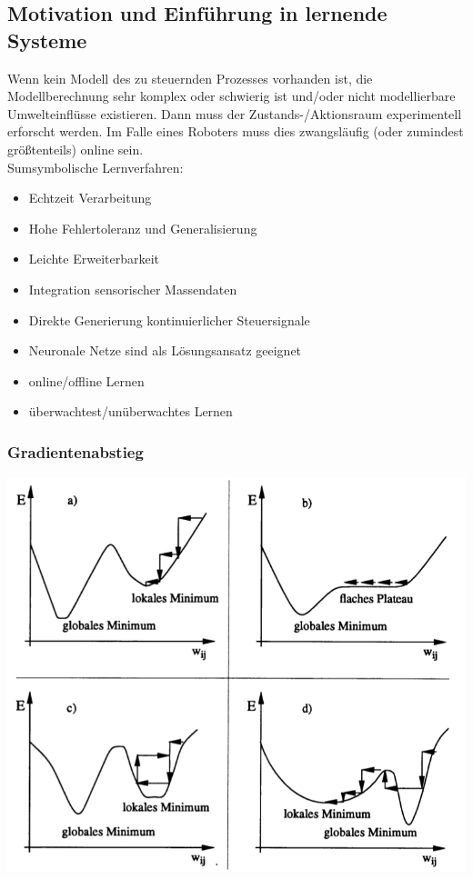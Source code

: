 \subsection{Motivation und Einführung in lernende Systeme}
%
Wenn kein Modell des zu steuernden Prozesses vorhanden ist, die Modellberechnung sehr komplex oder schwierig ist und/oder nicht modellierbare Umwelteinflüsse existieren.
Dann muss der Zustands-/Aktionsraum experimentell erforscht werden.
Im Falle eines Roboters muss dies zwangsläufig (oder zumindest größtenteils) online sein.\\
%
Sumsymbolische Lernverfahren:
\begin{itemize}
	\item Echtzeit Verarbeitung
	\item Hohe Fehlertoleranz und Generalisierung
	\item Leichte Erweiterbarkeit
	\item Integration sensorischer Massendaten
	\item Direkte Generierung kontinuierlicher Steuersignale
	\item Neuronale Netze sind als Lösungsansatz geeignet
	\item online/offline Lernen
	\item überwachtest/unüberwachtes Lernen
\end{itemize}

\subsubsection{Gradientenabstieg}
\begin{center}
	\includegraphics[width=.7\textwidth]{figures/gradientenabstieg.png}
\end{center}

